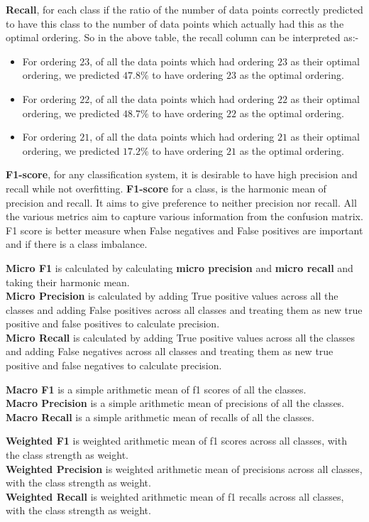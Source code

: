 \textbf{Recall}, for each class if the ratio of the number of data points correctly predicted to have this class to the number of data points which actually had this as the optimal ordering. So in the above table, the recall column can be interpreted as:-
\begin{itemize}
    \item For ordering $23$, of all the data points which had ordering $23$ as their optimal ordering, we predicted $47.8\%$ to have ordering $23$ as the optimal ordering.
    \item For ordering $22$, of all the data points which had ordering $22$ as their optimal ordering, we predicted $48.7\%$ to have ordering $22$ as the optimal ordering.
    \item For ordering $21$, of all the data points which had ordering $21$ as their optimal ordering, we predicted $17.2\%$ to have ordering $21$ as the optimal ordering.
\end{itemize} 

\textbf{F1-score}, for any classification system, it is desirable to have high precision and recall while not overfitting. \textbf{F1-score}  for a class, is the harmonic mean of precision and recall. It aims to give preference to neither precision nor recall. All the various metrics aim to capture various information from the confusion matrix. F1 score is better measure when False negatives and False positives are important and if there is a class imbalance.
\par \textbf{Micro F1} is calculated by calculating \textbf{micro precision} and \textbf{micro recall} and taking their harmonic mean.\\
\textbf{Micro Precision} is calculated by adding True positive values across all the classes and adding False positives across all classes and treating them as new true positive and false positives to calculate precision.\\
\textbf{Micro Recall} is calculated by adding True positive values across all the classes and adding False negatives across all classes and treating them as new true positive and false negatives to calculate precision.
\par \textbf{Macro F1} is a simple arithmetic mean of f1 scores of all the classes.\\
\textbf{Macro Precision} is a simple arithmetic mean of precisions of all the classes.\\
\textbf{Macro Recall} is a simple arithmetic mean of recalls of all the classes.
\par \textbf{Weighted F1} is weighted arithmetic mean of f1 scores across all classes, with the class strength as weight.\\
\textbf{Weighted Precision} is weighted arithmetic mean of precisions across all classes, with the class strength as weight.\\
\textbf{Weighted Recall} is weighted arithmetic mean of f1 recalls across all classes, with the class strength as weight.
